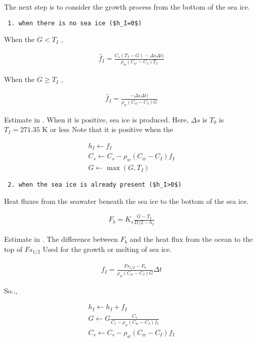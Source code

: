 The next step is to consider the growth process from the bottom of the
sea ice.

\begin{verbatim}
 1. when there is no sea ice ($h_I=0$)
\end{verbatim}

When the \(G < T_I\) ,

\begin{eqnarray}
  \tilde{f_I}
  =  \frac{C_s ( T_I - G ) - \Delta s \Delta t )}
          {\rho_w ( C_w - C_I ) T_I }
\end{eqnarray}

When the \(G \ge T_I\) ,

\begin{eqnarray}
  \tilde{f_I}
  =  \frac{- \Delta s \Delta t )}
          {\rho_w ( C_w - C_I ) G}
\end{eqnarray}

Estimate in . When it is positive, sea ice is produced. Here,
\(\Delta s\) is \(T_0\) is \(T_I=271.35\) K or less Note that it is
positive when the

\begin{eqnarray}
  h_I  \leftarrow  f_I \\
  C_s  \leftarrow  C_s - \rho_w ( C_w - C_I ) f_I \\
  G    \leftarrow  \max( G, T_I )
\end{eqnarray}

\begin{verbatim}
 2. when the sea ice is already present ($h_I>0$)
\end{verbatim}

Heat fluxes from the seawater beneath the sea ice to the bottom of the
sea ice.

\begin{eqnarray}
  F_b = K_s \frac{ G - T_I }{ D/2 - h_I }
\end{eqnarray}

Estimate in . The difference between \(F_b\) and the heat flux from the
ocean to the top of \(Fs_{1/2}\) Used for the growth or melting of sea
ice.

\begin{eqnarray}
  f_I = \frac{ Fs_{1/2} - F_b }
             { \rho_w ( C_w - C_I ) G } \Delta t
\end{eqnarray}

So..,

\begin{eqnarray}
  h_I  \leftarrow  h_I + f_I \\
  G    \leftarrow  G \frac{C_s}{C_s - \rho_w ( C_w - C_I ) f_I} \\
  C_s  \leftarrow  C_s - \rho_w ( C_w - C_I ) f_I
\end{eqnarray}

